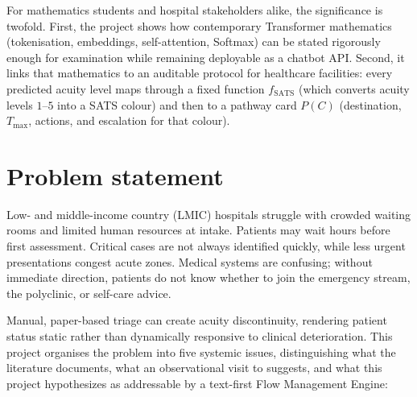 For mathematics students and hospital stakeholders alike, the significance is twofold. First, the project shows how contemporary Transformer mathematics (tokenisation, embeddings, self-attention, Softmax) can be stated rigorously enough for examination while remaining deployable as a chatbot API. Second, it links that mathematics to an auditable protocol for healthcare facilities: every predicted acuity level maps through a fixed function \(f_{\mathrm{SATS}}\) (which converts acuity levels \(1\)--\(5\) into a SATS colour) and then to a pathway card \(P(C)\) (destination, \(T_{\max}\), actions, and escalation for that colour).

\section{Problem statement}

Low- and middle-income country (LMIC) hospitals struggle with crowded waiting rooms and limited human resources at intake. Patients may wait hours before first assessment. Critical cases are not always identified quickly, while less urgent presentations congest acute zones. Medical systems are confusing; without immediate direction, patients do not know whether to join the emergency stream, the polyclinic, or self-care advice.

Manual, paper-based triage can create acuity discontinuity, rendering patient status static rather than dynamically responsive to clinical deterioration. This project organises the problem into five systemic issues, distinguishing what the literature documents, what an observational visit to \examplehospital{} suggests, and what this project hypothesizes as addressable by a text-first Flow Management Engine:

